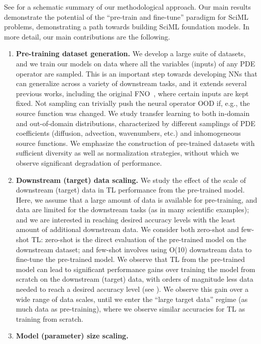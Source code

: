 See  for a schematic summary of our methodological approach.
Our main results demonstrate the potential of the ``pre-train and fine-tune'' paradigm for SciML problems, demonstrating a path towards building SciML foundation models.
%
In more detail, our main contributions are the following.
\begin{enumerate} 
    \item 
    \textbf{Pre-training dataset generation. }
    We develop a large suite of datasets, and we train our models on data where all the variables (inputs) of any PDE operator are sampled.
    This is an important step towards developing NNs that can generalize across a variety of downstream tasks, and it extends several previous works, including the original FNO~\cite{li2020fourier}, where certain inputs are kept fixed.
    Not sampling can trivially push the neural operator OOD if, e.g., the source function was changed. 
    We study transfer learning to both in-domain and out-of-domain distributions, characterized by different samplings of PDE coefficients (diffusion, advection, wavenumbers, etc.) and inhomogeneous source functions.
    We emphasize the construction of pre-trained datasets with sufficient diversity as well as normalization strategies, without which we observe significant degradation of performance.
    \item 
    \textbf{Downstream (target) data scaling.}
    We study the effect of the scale of downstream (target) data in TL performance from the pre-trained model.
    Here, we assume that a large amount of data is available for pre-training, and data are limited for the downstream tasks (as in many scientific examples); and we are interested in reaching desired accuracy levels with the least amount of additional downstream data.
    We consider both zero-shot and few-shot TL: zero-shot is the direct evaluation of the pre-trained model on the downstream dataset; and
    few-shot involves using O(10) downstream data to fine-tune the pre-trained model.
    We observe that TL from the pre-trained model can lead to significant performance gains over training the model from scratch on the downstream (target) data, with orders of magnitude less data needed to reach a desired accuracy level (see ). 
    We observe this gain over a wide range of data scales, until we enter the ``large target data'' regime (as much data as pre-training), where we observe similar accuracies for TL as training from scratch.
    \item
    \textbf{Model (parameter) size scaling.} 

\end{enumerate}
